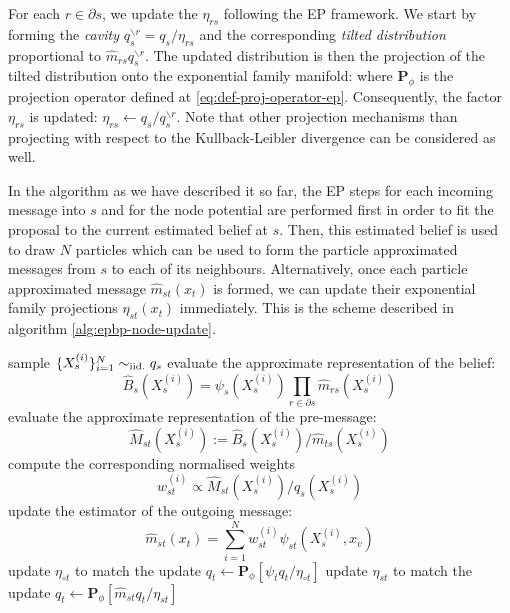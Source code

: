 For each $r\in\partial s$, we update the $\eta_{rs}$ following the EP framework. We start by forming the \emph{cavity} $q^{\backslash r}_{s}=q_{s}/\eta_{rs}$ and the corresponding \emph{tilted distribution} proportional to $\widehat m_{rs} q_{s}^{\backslash r}$.  The updated distribution is then the projection of the tilted distribution onto the exponential family manifold:
where $\mathbf P_{\phi}$ is the projection operator defined at \ref{eq:def-proj-operator-ep}. Consequently, the factor $\eta_{rs}$ is updated: $\eta_{rs} \leftarrow  q_{s}/ q_{s}^{\backslash r}$. Note that other projection mechanisms than projecting with respect to the Kullback-Leibler divergence can be considered as well. 

In the algorithm as we have described it so far, the EP steps for each incoming message into $s$ and for the node potential are performed first in order to fit the proposal to the current estimated belief at $s$. Then, this estimated belief is used to draw $N$ particles which can be used to form the particle approximated messages from $s$ to each of its neighbours. 
Alternatively, once each particle approximated message $\widehat{m}_{st}(x_t)$ is formed, we can update their exponential family projections $\eta_{st}(x_t)$ immediately. This is the scheme described in algorithm \ref{alg:epbp-node-update}.

\begin{algorithm}[!h]\small
	\caption{\label{alg:epbp-node-update}}
	\begin{spacing}{1.2}
	\begin{algorithmic}[1]
		\State sample $\{X^{(i)}_{s}\}_{i=1}^{N}\sim_{\mathrm{iid.}} q_{s}$	
		\State evaluate the approximate representation of the belief: $$\widehat B_{s}(X_{s}^{(i)}) = \psi_{s}(X_{s}^{(i)})\prod_{r\in\partial {s}}\widehat m_{rs}(X_{s}^{(i)})$$%
			\State evaluate the approximate representation of the pre-message: $$\widehat M_{st}(X_{s}^{(i)}) :=\widehat B_{s}(X_{s}^{(i)})/\widehat m_{ts}(X_{s}^{(i)})$$
			\State compute the corresponding normalised weights $$ w_{st}^{(i)}\propto \widehat M_{st}(X_{s}^{(i)})/q_{s}(X_{s}^{(i)})$$
			\State update the estimator of the outgoing message: $$\widehat m_{st}(x_{t})=\sum_{i=1}^{N}w^{(i)}_{st}\psi_{st}(X_{s}^{(i)},x_{v})$$
			\State update $\eta_{\circ t}$ to match the update $q_{t} \leftarrow \mathbf P_{\phi}[\psi_{t}q_{t}/\eta_{\circ t}]$ 
			\State update $\eta_{st}$ to match the update $q_{t}\leftarrow \mathbf P_{\phi}[\widehat m_{st}q_{t}/\eta_{st}]$%
		\EndFor
	\end{algorithmic}
	\end{spacing}
\end{algorithm}

